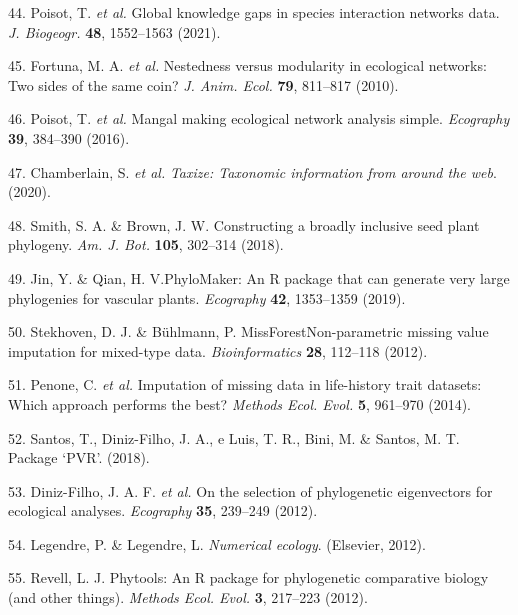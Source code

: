 \documentclass[
  12pt,
  a4paper,
]{article}
\begin{document}
\leavevmode\hypertarget{ref-poisot2021}{}%
44. Poisot, T. \emph{et al.} Global knowledge gaps in species interaction networks data. \emph{J. Biogeogr.} \textbf{48}, 1552--1563 (2021).

\leavevmode\hypertarget{ref-fortuna2010}{}%
45. Fortuna, M. A. \emph{et al.} Nestedness versus modularity in ecological networks: Two sides of the same coin? \emph{J. Anim. Ecol.} \textbf{79}, 811--817 (2010).

\leavevmode\hypertarget{ref-poisot2016}{}%
46. Poisot, T. \emph{et al.} Mangal making ecological network analysis simple. \emph{Ecography} \textbf{39}, 384--390 (2016).

\leavevmode\hypertarget{ref-chamberlain2020}{}%
47. Chamberlain, S. \emph{et al.} \emph{Taxize: Taxonomic information from around the web}. (2020).

\leavevmode\hypertarget{ref-smith2018}{}%
48. Smith, S. A. \& Brown, J. W. Constructing a broadly inclusive seed plant phylogeny. \emph{Am. J. Bot.} \textbf{105}, 302--314 (2018).

\leavevmode\hypertarget{ref-jin2019}{}%
49. Jin, Y. \& Qian, H. V.PhyloMaker: An R package that can generate very large phylogenies for vascular plants. \emph{Ecography} \textbf{42}, 1353--1359 (2019).

\leavevmode\hypertarget{ref-stekhoven2012}{}%
50. Stekhoven, D. J. \& Bühlmann, P. MissForestNon-parametric missing value imputation for mixed-type data. \emph{Bioinformatics} \textbf{28}, 112--118 (2012).

\leavevmode\hypertarget{ref-penone2014}{}%
51. Penone, C. \emph{et al.} Imputation of missing data in life-history trait datasets: Which approach performs the best? \emph{Methods Ecol. Evol.} \textbf{5}, 961--970 (2014).

\leavevmode\hypertarget{ref-santos2018}{}%
52. Santos, T., Diniz-Filho, J. A., e Luis, T. R., Bini, M. \& Santos, M. T. Package `PVR'. (2018).

\leavevmode\hypertarget{ref-diniz-filho2012}{}%
53. Diniz-Filho, J. A. F. \emph{et al.} On the selection of phylogenetic eigenvectors for ecological analyses. \emph{Ecography} \textbf{35}, 239--249 (2012).

\leavevmode\hypertarget{ref-legendre2012}{}%
54. Legendre, P. \& Legendre, L. \emph{Numerical ecology}. (Elsevier, 2012).

\leavevmode\hypertarget{ref-revell2012}{}%
55. Revell, L. J. Phytools: An R package for phylogenetic comparative biology (and other things). \emph{Methods Ecol. Evol.} \textbf{3}, 217--223 (2012).
\end{document}
